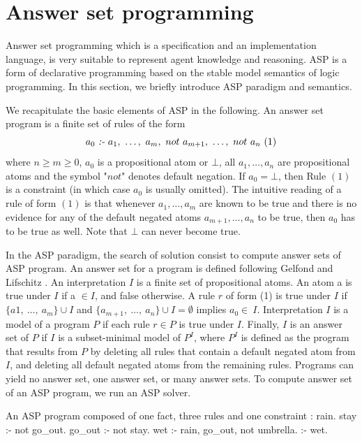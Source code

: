 \documentclass{aamas2012}
\begin{document}
\section{Answer set programming}

	Answer set programming which is a specification and an implementation language, is very suitable to represent agent knowledge and reasoning.
	ASP is a form of declarative programming based on the stable model semantics of logic programming.
	In this section, we briefly introduce ASP paradigm and semantics.

	We recapitulate the basic elements of ASP in the following.
	An answer set program is a finite set of rules of the form
	$$a_{0}\ \emph{:-}\ a_{1},\ \ldots,\ a_{m},\ not\ a_{m+1},\ \ldots,\ not\ a_{n}\ (1)$$
	where $n \ge m \ge 0$, $a_{0}$ is a propositional atom or $\bot$, all
	$a_{1}, \ldots ,a_{n}$ are propositional atoms and the symbol "$not$" denotes default negation.
	If $a_{0} = \bot$, then Rule $(1)$ is a constraint (in which case $a_{0}$ is usually omitted).
	The intuitive reading of a rule of form $(1)$ is that whenever $a_{1}, \ldots, a_{m}$
	are known to be true and there is no evidence for any of the default negated atoms $a_{m+1}, \ldots, a_{n}$ to be true, then $a_{0}$ has to be true as well.
	Note that $\bot$ can never become true.

	In the ASP paradigm, the search of solution consist to compute answer sets of ASP program.
	An answer set for a program is defined following Gelfond and Lifschitz \cite{DBLP:conf/iclp/GelfondL88}.
	An interpretation $I$ is a finite set of propositional atoms.
	An atom a is true under $I$ if a $\in I$, and false otherwise.
	A rule $r$ of form (1) is true under $I$ if $\{a1,\ \dots,\ a_{m}\} \cup I$ and $\{a_{m+1},\ \ldots,\ a_{n}\} \cup I = \emptyset$ implies $a_{0} \in\ I$.
	Interpretation $I$ is a model of a program $P$ if each rule $r \in P$ is true under $I$.
	Finally, $I$ is an answer set of $P$ if $I$ is a subset-minimal model of $P^{I}$,
	where $P^{I}$ is defined as the program that results from $P$ by deleting all rules that contain a default negated atom from $I$, 
	and deleting all default negated atoms from the remaining rules.
	Programs can yield no answer set, one answer set, or many answer sets.
	To compute answer set of an ASP program, we run an ASP solver.
	
	\begin{example}
		\label{ASP_example}
		An ASP program composed of one fact, three rules and one constraint :\newline
		\newline
		rain.\newline
		stay :- not go\_out.\newline
		go\_out :- not stay.\newline
		wet :- rain, go\_out, not umbrella.\newline
		:- wet.
	\end{example}
	
\end{document}
